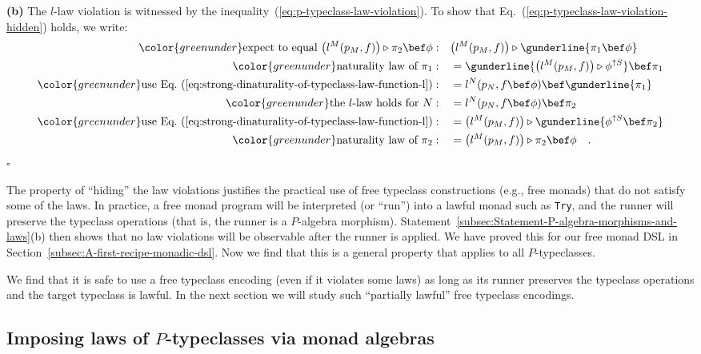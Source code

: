 \textbf{(b)} The $l$-law violation is witnessed by the inequality~(\ref{eq:p-typeclass-law-violation}).
To show that Eq.~(\ref{eq:p-typeclass-law-violation-hidden}) holds,
we write:
\begin{align*}
{\color{greenunder}\text{expect to equal }\big(l^{M}(p_{M},f)\big)\triangleright\pi_{2}\bef\phi:}\quad & \big(l^{M}(p_{M},f)\big)\triangleright\gunderline{\pi_{1}\bef\phi}\\
{\color{greenunder}\text{naturality law of }\pi_{1}:}\quad & =\gunderline{\big(l^{M}(p_{M},f)\big)\triangleright\phi^{\uparrow S}}\bef\pi_{1}\\
{\color{greenunder}\text{use Eq.~(\ref{eq:strong-dinaturality-of-typeclass-law-function-l})}:}\quad & =l^{N}(p_{N},f\bef\phi)\bef\gunderline{\pi_{1}}\\
{\color{greenunder}\text{the }l\text{-law holds for }N:}\quad & =l^{N}(p_{N},f\bef\phi)\bef\pi_{2}\\
{\color{greenunder}\text{use Eq.~(\ref{eq:strong-dinaturality-of-typeclass-law-function-l})}:}\quad & =\big(l^{M}(p_{M},f)\big)\triangleright\gunderline{\phi^{\uparrow S}\bef\pi_{2}}\\
{\color{greenunder}\text{naturality law of }\pi_{2}:}\quad & =\big(l^{M}(p_{M},f)\big)\triangleright\pi_{2}\bef\phi\quad.
\end{align*}
$\square$

The property of \textsf{``}hiding\textsf{''} the law violations justifies the practical
use of free typeclass constructions (e.g., free monads) that do not
satisfy some of the laws. In practice, a free monad program will be
interpreted (or \textsf{``}run\textsf{''}) into a lawful monad such as \lstinline!Try!,
and the runner will preserve the typeclass operations (that is, the
runner is a $P$-algebra morphism). Statement~\ref{subsec:Statement-P-algebra-morphisms-and-laws}(b)
then shows that no law violations will be observable after the runner
is applied. We have proved this for our free monad DSL in Section~\ref{subsec:A-first-recipe-monadic-dsl}.
Now we find that this is a general property that applies to all $P$-typeclasses.

We find that it is safe to use a free typeclass encoding (even if
it violates some laws) as long as its runner preserves the typeclass
operations and the target typeclass is lawful. In the next section
we will study such \textsf{``}partially lawful\textsf{''} free typeclass encodings.

\subsection{Imposing laws of $P$-typeclasses via monad algebras}

